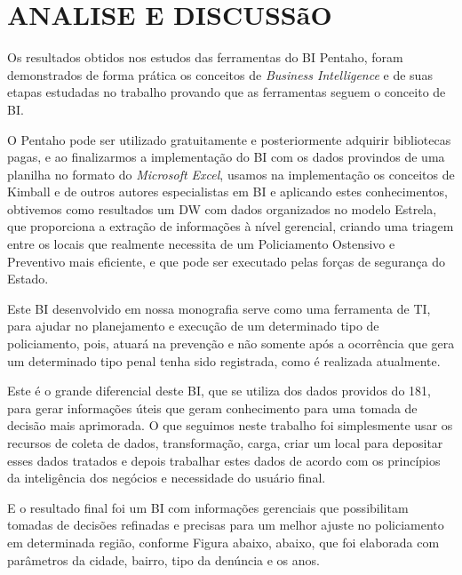 %
%

\chapter{ANALISE E DISCUSS\~{a}O}

Os resultados obtidos nos estudos das ferramentas do BI Pentaho, foram demonstrados de forma pr\'{a}tica os conceitos de \textit{Business Intelligence} e de suas etapas estudadas no trabalho provando que as ferramentas seguem o conceito de BI. 

O Pentaho pode ser utilizado gratuitamente e posteriormente adquirir bibliotecas pagas, e ao finalizarmos a implementa\c{c}\~{a}o do BI com os dados provindos de uma planilha no formato do \textit{Microsoft Excel}, usamos na implementa\c{c}\~{a}o os conceitos de Kimball e de outros autores especialistas em BI e aplicando estes conhecimentos, obtivemos como resultados um DW com dados organizados no modelo Estrela, que proporciona a extra\c{c}\~{a}o de informa\c{c}\~{o}es \`{a} nível gerencial, criando uma triagem entre os locais que realmente necessita de um Policiamento Ostensivo e Preventivo mais eficiente, e que pode ser executado pelas for\c{c}as de seguran\c{c}a do Estado.

Este BI desenvolvido em nossa monografia serve como uma ferramenta de TI, para ajudar no planejamento e execu\c{c}\~{a}o de um determinado tipo de policiamento, pois, atuar\'{a} na preven\c{c}\~{a}o e n\~{a}o somente após a ocorrência que gera um determinado tipo penal tenha sido registrada, como \'{e} realizada atualmente. 

Este \'{e} o grande diferencial deste BI, que se utiliza dos dados providos do 181, para gerar informa\c{c}\~{o}es úteis que geram conhecimento para uma tomada de decis\~{a}o mais aprimorada.
O que seguimos neste trabalho foi simplesmente usar os recursos de coleta de dados, transforma\c{c}\~{a}o, carga, criar um local para depositar esses dados tratados e depois trabalhar estes dados de acordo com os princípios da inteligência dos negócios e necessidade do usu\'{a}rio final.

E o resultado final foi um BI com informa\c{c}\~{o}es gerenciais que possibilitam tomadas de decis\~{o}es refinadas e precisas para um melhor ajuste no policiamento em determinada regi\~{a}o, conforme Figura abaixo, abaixo, que foi elaborada com parâmetros da cidade, bairro, tipo da denúncia e os anos.

